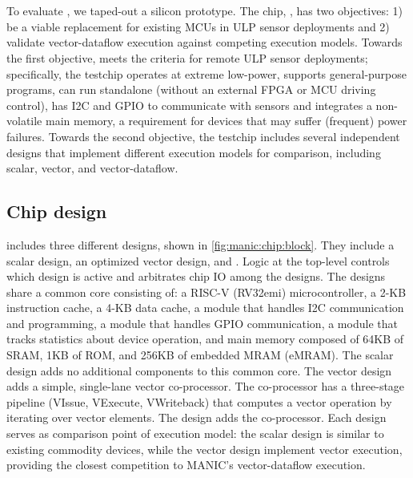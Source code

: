 
\section{\msilicon}
\label{manic:silicon}
To evaluate \manic, we taped-out a silicon prototype. 
% 
The chip, \msilicon, has two objectives: 1) be a viable replacement for existing MCUs in ULP sensor deployments and 2) validate vector-dataflow execution against competing execution models.
% 
Towards the first objective, \msilicon meets the criteria for remote ULP sensor deployments; specifically, the testchip operates at extreme low-power, supports general-purpose programs, can run standalone (without an external FPGA or MCU driving control), has I2C and GPIO to communicate with sensors and integrates a non-volatile main memory, a requirement for devices that may suffer (frequent) power failures.
% 
Towards the second objective, the \msilicon testchip includes several independent designs that implement different execution models for comparison, including scalar, vector, and vector-dataflow.

\figMANICChipBlock
\subsection{Chip design}
\msilicon includes three different designs, shown in \autoref{fig:manic:chip:block}.
%
They include a scalar design, an optimized vector design, and \manic.
% 
Logic at the top-level controls which design is active and arbitrates chip IO among the designs.
%
The designs share a common core consisting of: a RISC-V (RV32emi) microcontroller, a 2-KB instruction cache, a 4-KB data cache, a module that handles I2C communication and programming, a module that handles GPIO communication, a module that tracks statistics about device operation, and main memory composed of 64KB of SRAM, 1KB of ROM, and 256KB of embedded MRAM (eMRAM). 
% 
The scalar design adds no additional components to this common core.
% 
The vector design adds a simple, single-lane vector co-processor.
% 
The co-processor has a three-stage pipeline (VIssue, VExecute, VWriteback) that computes a vector operation by iterating over vector elements.
% 
The \manic design adds the \manic co-processor.
% 
Each design serves as comparison point of execution model: the scalar design is similar to existing commodity devices, while the vector design implement vector execution, providing the closest competition to MANIC's vector-dataflow execution.


